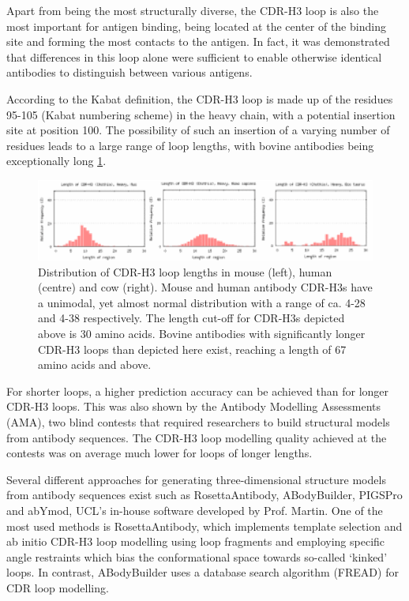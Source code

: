 \documentclass[12pt]{article}
\begin{document}
Apart from being the most structurally diverse, the CDR-H3 loop is
also the most important for antigen binding, being located at the
center of the binding site and forming the most contacts to the
antigen\cite{MacCallum1996}. In fact, it was demonstrated that
differences in this loop alone were sufficient to enable otherwise
identical antibodies to distinguish between various
antigens\cite{Xu2000}.

According to the Kabat definition, the CDR-H3 loop is made up of the
residues 95-105 (Kabat numbering scheme\cite{Kabat1992}) in the heavy
chain, with a potential insertion site at position 100. The
possibility of such an insertion of a varying number of residues leads
to a large range of loop lengths, with bovine antibodies being
exceptionally long \ref{fig:loopdist}.

\begin{figure}
  \includegraphics[scale=1]{loopdist.eps}
  \centering
  \caption { Distribution of CDR-H3 loop lengths in mouse (left),
    human (centre) and cow (right). Mouse and human antibody CDR-H3s
    have a unimodal, yet almost normal distribution with a range of
    ca. 4-28 and 4-38 respectively. The length cut-off for CDR-H3s
    depicted above is 30 amino acids. Bovine antibodies with
    significantly longer CDR-H3 loops than depicted here exist,
    reaching a length of 67 amino acids and
    above\protect\cite{Wong2015}.}  
  \label{fig:loopdist}
\end{figure}

For shorter loops, a higher prediction accuracy can be achieved than
for longer CDR-H3 loops. This was also shown by the Antibody Modelling
Assessments (AMA), two blind contests that required researchers to
build structural models from antibody sequences. The CDR-H3 loop
modelling quality achieved at the contests was on average much lower
for loops of longer lengths\cite{Almagro2011,Almagro2014}.

Several different approaches for generating three-dimensional
structure models from antibody sequences exist such as
RosettaAntibody\cite{Sircar2009,Sivasubramanian2009}, 
ABodyBuilder\cite{Leem2016}, PIGSPro\cite{Lepore2017} and abYmod,
UCL's in-house software developed by Prof. Martin. One of the most
used methods is RosettaAntibody, which implements template selection
and ab initio CDR-H3 loop modelling using loop fragments and employing
specific angle restraints which bias the conformational space towards
so-called `kinked' loops\cite{Schoeder2021,Weitzner2017}. In
contrast, ABodyBuilder uses a database search algorithm
(FREAD\cite{Choi2010}) for CDR loop modelling.
\end{document}
